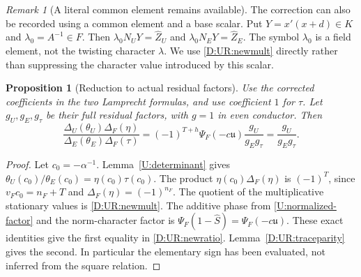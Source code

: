 \documentclass[11pt]{amsart}
\newtheorem{proposition}[theorem]{Proposition}
\theoremstyle{definition}
\theoremstyle{remark}
\newtheorem{remark}[theorem]{Remark}
\begin{document}
\begin{remark}[A literal common element remains available]
The correction can also be recorded using a common element and a base
scalar. Put $Y=x'(x+d)\in K$ and $\lambda_0=A^{-1}\in F$.
Then $\lambda_0N_UY=\widehat Z_U$ and
$\lambda_0N_EY=\widehat Z_E$. The symbol $\lambda_0$ is a field element,
not the twisting character $\lambda$. We use \eqref{D:UR:newmult} directly
rather than suppressing the character value introduced by this scalar.
\end{remark}

\begin{proposition}[Reduction to actual residual factors]\label{D:UR:criticalratio}
Use the corrected coefficients in the two Lamprecht formulas, and use
coefficient $1$ for $\tau$. Let $g_U,g_E,g_\tau$ be their full residual
factors, with $g=1$ in even conductor. Then
\begin{equation}\label{D:UR:newratio}
 \frac{\Delta_U(\theta_U)\Delta_F(\eta)}
      {\Delta_E(\theta_E)\Delta_F(\tau)}
  =(-1)^{T+h}\Psi_F(-c\mathfrak u)
                      \frac{g_U}{g_Eg_\tau}
  =\frac{g_U}{g_Eg_\tau}.
\end{equation}
\end{proposition}
\begin{proof}
Let $c_0=-\alpha^{-1}$. Lemma~\ref{U:determinant} gives
$\theta_U(c_0)/\theta_E(c_0)=\eta(c_0)\tau(c_0)$.
The product $\eta(c_0)\Delta_F(\eta)$ is $(-1)^T$, since
$v_Fc_0=n_F+T$ and $\Delta_F(\eta)=(-1)^{n_F}$.
The quotient of the multiplicative stationary values is \eqref{D:UR:newmult}.
The additive phase from \eqref{U:normalized-factor} and the norm-character factor is
$\Psi_F(1-\widehat S)=\Psi_F(-c\mathfrak u)$.
These exact identities give the first equality in \eqref{D:UR:newratio}.
Lemma~\ref{D:UR:traceparity} gives the second. In particular the elementary
sign has been evaluated, not inferred from the square relation.
\end{proof}
\end{document}
